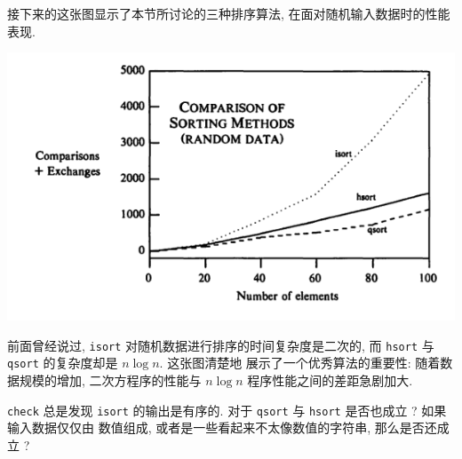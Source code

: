 接下来的这张图显示了本节所讨论的三种排序算法, 在面对随机输入数据时的性能
表现.
\begin{center}
    \includegraphics[scale=0.7]{images/sort_cmp.png}
\end{center}

前面曾经说过, \texttt{isort} 对随机数据进行排序的时间复杂度是二次的, 而
\texttt{hsort} 与 \texttt{qsort} 的复杂度却是 $n \log n$. 这张图清楚地
展示了一个优秀算法的重要性: 随着数据规模的增加, 二次方程序的性能与
$n \log n$ 程序性能之间的差距急剧加大.
\begin{exercise}
    \texttt{check} 总是发现 \texttt{isort} 的输出是有序的. 对于
    \texttt{qsort} 与 \texttt{hsort} 是否也成立 ? 如果输入数据仅仅由
    数值组成, 或者是一些看起来不太像数值的字符串, 那么是否还成立 ?
\end{exercise}
